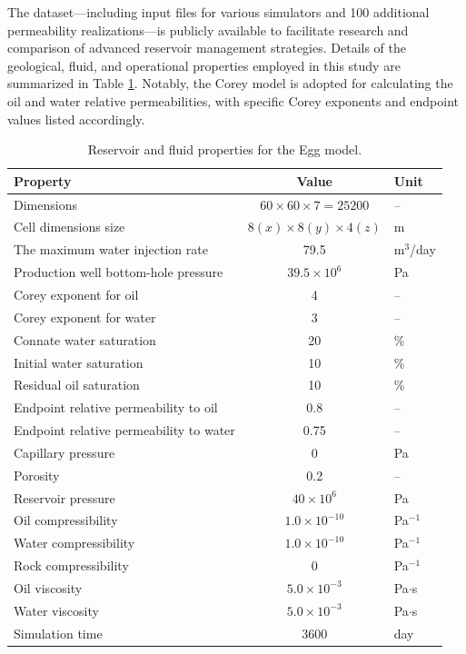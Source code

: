 \documentclass[pdflatex,sn-basic]{sn-jnl}%
\theoremstyle{thmstyleone}%
\theoremstyle{thmstyletwo}%
\theoremstyle{thmstylethree}%
\begin{document}
The dataset—including input files for various simulators and 100 additional permeability realizations—is publicly available to facilitate research and comparison of advanced reservoir management strategies. Details of the geological, fluid, and operational properties employed in this study are summarized in Table \ref{tab3}. Notably, the Corey model is adopted for calculating the oil and water relative permeabilities, with specific Corey exponents and endpoint values listed accordingly.

\begin{table}[h]
\centering
\caption{Reservoir and fluid properties for the Egg model.}
\label{tab3}
\begin{tabular}{lcl}
\hline
\textbf{Property} & \textbf{Value} & \textbf{Unit} \\
\hline
Dimensions & $60 \times 60 \times 7 = 25200$ & -- \\
Cell dimensions size & $8(x) \times 8(y) \times 4(z)$ & m \\
The maximum water injection rate & 79.5 & m$^3$/day \\
Production well bottom-hole pressure & $39.5 \times 10^6$ & Pa \\
Corey exponent for oil & 4 & -- \\
Corey exponent for water & 3 & -- \\
Connate water saturation & 20 & \% \\
Initial water saturation & 10 & \% \\
Residual oil saturation & 10 & \% \\
Endpoint relative permeability to oil & 0.8 & -- \\
Endpoint relative permeability to water & 0.75 & -- \\
Capillary pressure & 0 & Pa \\
Porosity & 0.2 & -- \\
Reservoir pressure & $40 \times 10^6$ & Pa \\
Oil compressibility & $1.0 \times 10^{-10}$ & Pa$^{-1}$ \\
Water compressibility & $1.0 \times 10^{-10}$ & Pa$^{-1}$ \\
Rock compressibility & 0 & Pa$^{-1}$ \\
Oil viscosity & $5.0 \times 10^{-3}$ & Pa$\cdot$s \\
Water viscosity & $5.0 \times 10^{-3}$ & Pa$\cdot$s \\
Simulation time & 3600 & day \\
\hline
\end{tabular}
\end{table}
\end{document}
